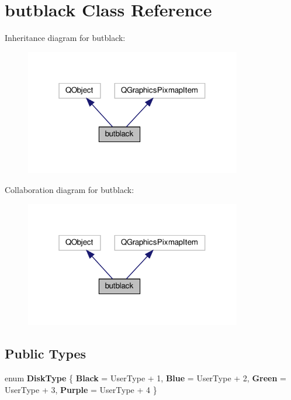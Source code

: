 \hypertarget{classbutblack}{}\section{butblack Class Reference}
\label{classbutblack}


Inheritance diagram for butblack\+:
\nopagebreak
\begin{figure}[H]
\begin{center}
\leavevmode
\includegraphics[width=268pt]{classbutblack__inherit__graph}
\end{center}
\end{figure}


Collaboration diagram for butblack\+:
\nopagebreak
\begin{figure}[H]
\begin{center}
\leavevmode
\includegraphics[width=268pt]{classbutblack__coll__graph}
\end{center}
\end{figure}
\subsection*{Public Types}
\begin{DoxyCompactItemize}
\item 
\mbox{\label{classbutblack_ad799fb56af60a3269b1505a34701ebae}} 
enum {\bfseries Disk\+Type} \{ {\bfseries Black} = User\+Type + 1, 
{\bfseries Blue} = User\+Type + 2, 
{\bfseries Green} = User\+Type + 3, 
{\bfseries Purple} = User\+Type + 4
 \}
\end{DoxyCompactItemize}
